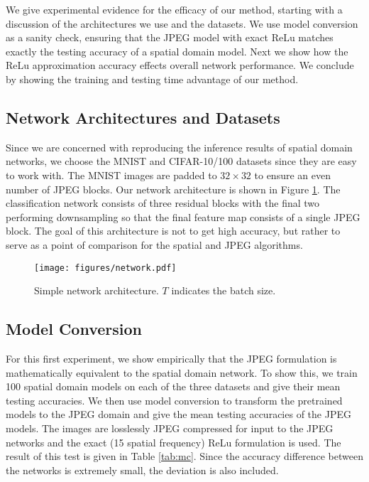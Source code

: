 \documentclass[10pt,twocolumn,letterpaper]{article}
\begin{document}
We give experimental evidence for the efficacy of our method, starting with a discussion of the architectures we use and the datasets. We use model conversion as a sanity check, ensuring that the JPEG model with exact ReLu matches exactly the testing accuracy of a spatial domain model. Next we show how the ReLu approximation accuracy effects overall network performance. We conclude by showing the training and testing time advantage of our method.

\subsection{Network Architectures and Datasets}

Since we are concerned with reproducing the inference results of spatial domain networks, we choose the MNIST \cite{lecun1998mnist} and CIFAR-10/100 \cite{krizhevsky2009learning} datasets since they are easy to work with. The MNIST images are padded to $32 \times 32$ to ensure an even number of JPEG blocks. Our network architecture is shown in Figure \ref{fig:na}. The classification network consists of three residual blocks with the final two performing downsampling so that the final feature map consists of a single JPEG block. The goal of this architecture is not to get high accuracy, but rather to serve as a point of comparison for the spatial and JPEG algorithms.

\begin{figure}
    \centering
    \texttt{[image: figures/network.pdf]}
    \caption{Simple network architecture. $T$ indicates the batch size.}
    \label{fig:na}
\end{figure}\subsection{Model Conversion}

For this first experiment, we show empirically that the JPEG formulation is mathematically equivalent to the spatial domain network. To show this, we train 100 spatial domain models on each of the three datasets and give their mean testing accuracies. We then use model conversion to transform the pretrained models to the JPEG domain and give the mean testing accuracies of the JPEG models. The images are losslessly JPEG compressed for input to the JPEG networks and the exact (15 spatial frequency) ReLu formulation is used. The result of this test is given in Table \ref{tab:mc}. Since the accuracy difference between the networks is extremely small, the deviation is also included. 
\end{document}
